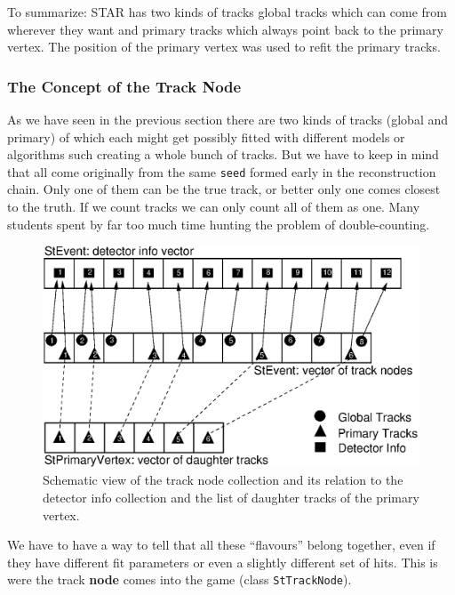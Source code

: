 \documentclass[twoside]{article}
\begin{document}
To summarize: STAR has two kinds of tracks global tracks which can
come from wherever they want and primary tracks which always point
back to the primary vertex. The position of the primary vertex was
used to refit the primary tracks.

\subsubsection{The Concept of the Track Node}
\label{sec:node}

As we have seen in the previous section there are two kinds of tracks
(global and primary) of which each might get possibly fitted with
different models or algorithms such creating a whole bunch of tracks.
But we have to keep in mind that all come originally from the same
\texttt{seed} formed early in the reconstruction chain. Only one of
them can be the true track, or better only one comes closest to the
truth. If we count tracks we can only count all of them as one.  Many
students spent by far too much time hunting the problem of
double-counting.\\
\begin{figure}[htb]
    \begin{center}
        \includegraphics[width=\textwidth]{nodes.eps}
        \caption{Schematic view of the track node collection and
            its relation to the detector info collection and the list
            of daughter tracks of the primary vertex.}
        \label{fig:nodes}
    \end{center}
\end{figure}
We have to have a way to tell that all these ``flavours'' belong
together, even if they have different fit parameters or even a
slightly different set of hits. This is were the track \textbf{node}
comes into the game (class \texttt{StTrackNode}).
\end{document}
